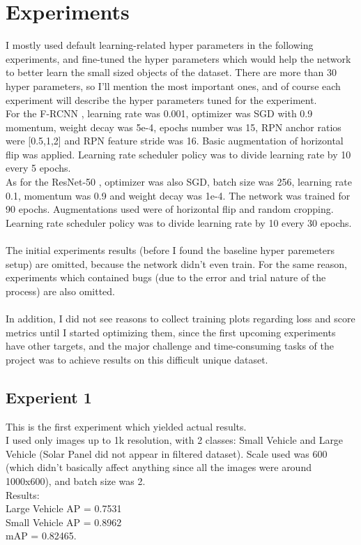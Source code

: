 \documentclass[]{article}
\begin{document}
\section{Experiments}
I mostly used default learning-related hyper parameters in the following experiments, and fine-tuned the hyper parameters which would help the network to better learn the small sized objects of the dataset. There are more than 30 hyper parameters, so I'll mention the most important ones, and of course each experiment will describe the hyper parameters tuned for the experiment.\\
For the F-RCNN \cite{fasterrcnn}, learning rate was 0.001, optimizer was SGD with 0.9 momentum, weight decay was 5e-4, epochs number was 15, RPN anchor ratios were [0.5,1,2] and RPN feature stride was 16. Basic augmentation of horizontal flip was applied. Learning rate scheduler policy was to divide learning rate by 10 every 5 epochs.\\
As for the ResNet-50 \cite{resnet}, optimizer was also SGD, batch size was 256, learning rate 0.1, momentum was 0.9 and weight decay was 1e-4. The network was trained for 90 epochs. Augmentations used were of horizontal flip and random cropping. Learning rate scheduler policy was to divide learning rate by 10 every 30 epochs.
\\\\
The initial experiments results (before I found the baseline hyper paremeters setup) are omitted, because the network didn't even train. For the same reason, experiments which contained bugs (due to the error and trial nature of the process) are also omitted.
\\\\
In addition, I did not see reasons to collect training plots regarding loss and score metrics until I started optimizing them, since the first upcoming experiments have other targets, and the major challenge and time-consuming tasks of the project was to achieve results on this difficult unique dataset.

\subsection{Experient 1}
This is the first experiment which yielded actual results.\\
I used only images up to 1k resolution, with 2 classes: Small Vehicle and Large Vehicle (Solar Panel did not appear in filtered dataset).
Scale used was 600 (which didn't basically affect anything since all the images were around 1000x600), and batch size was 2.\\
Results:\\
Large Vehicle AP = 0.7531\\
Small Vehicle AP = 0.8962\\
mAP = 0.82465.\\
\end{document}
